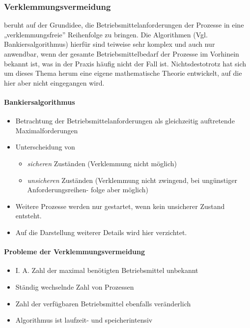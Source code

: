 \documentclass[11pt]{article}
\begin{document}
\subsubsection*{Verklemmungsvermeidung}
\label{sec:org9bc4a01}
beruht auf der Grundidee, die Betriebsmittelanforderungen der Prozesse
in eine „verklemmungsfreie” Reihenfolge zu bringen. Die Algorithmen
(Vgl. Bankiersalgorithmus) hierfür sind teiweise sehr komplex und auch
nur anwendbar, wenn der gesamte Betriebsmittelbedarf der Prozesse im
Vorhinein bekannt ist, was in der Praxis häufig nicht der Fall ist.
Nichtsdestotrotz hat sich um dieses Thema herum eine eigene
mathematische Theorie entwickelt, auf die hier aber nicht eingegangen
wird.
\paragraph*{Bankiersalgorithmus}
\label{sec:org8997af0}
\begin{itemize}
\item Betrachtung der Betriebsmittelanforderungen als gleichzeitig
auftretende Maximalforderungen
\item Unterscheidung von
\begin{itemize}
\item \emph{sicheren} Zuständen (Verklemmung nicht möglich)
\item \emph{unsicheren} Zuständen (Verklemmung nicht zwingend, bei
ungünstiger Anforderungsreihen- folge aber möglich)
\end{itemize}
\item Weitere Prozesse werden nur gestartet, wenn kein unsicherer Zustand
entsteht.
\item Auf die Darstellung weiterer Details wird hier verzichtet.
\end{itemize}
\paragraph*{Probleme der Verklemmungsvermeidung}
\label{sec:org9b61d64}
\begin{itemize}
\item I. A. Zahl der maximal benötigten Betriebsmittel unbekannt
\item Ständig wechselnde Zahl von Prozessen
\item Zahl der verfügbaren Betriebsmittel ebenfalls veränderlich
\item Algorithmus ist laufzeit- und speicherintensiv
\end{itemize}
\end{document}
